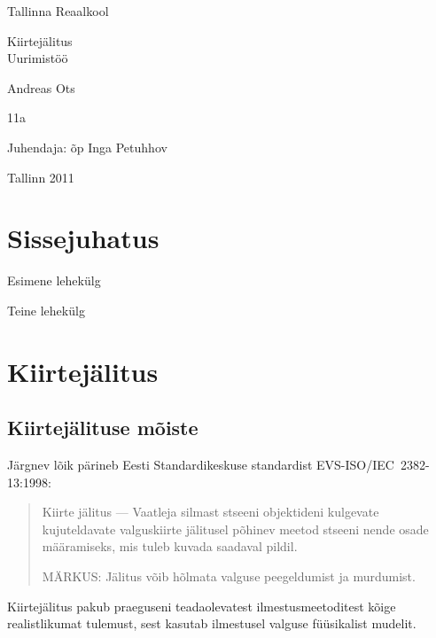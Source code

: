 \documentclass[a4paper,12pt]{report}
\begin{document}
\begin{center}
Tallinna Reaalkool

\vfill

Kiirtejälitus\\
Uurimistöö

\vfill

\end{center}

\begin{raggedleft}

Andreas Ots

11a

Juhendaja: õp Inga Petuhhov

\end{raggedleft}

\vfill

\begin{center}

Tallinn 2011

\end{center}
\clearpage

\tableofcontents
\listoffigures
\listoftables
\lstlistoflistings

\chapter*{Sissejuhatus}
\pagestyle{plain}
\thispagestyle{empty}
Esimene lehekülg

\clearpage

Teine lehekülg

\chapter{Kiirtejälitus}
\section{Kiirtejälituse mõiste}
Järgnev lõik pärineb Eesti Standardikeskuse standardist EVS-ISO/IEC~2382-13:1998:
\begin{quote}
Kiirte jälitus --- Vaatleja silmast stseeni objektideni kulgevate
kujuteldavate valguskiirte jälitusel põhinev meetod stseeni nende osade
määramiseks, mis tuleb kuvada saadaval pildil.

MÄRKUS: Jälitus võib hõlmata valguse peegeldumist ja murdumist.\cite{ISO:2382-13}
\end{quote}

Kiirtejälitus pakub praeguseni teadaolevatest ilmestusmeetoditest kõige
realistlikumat tulemust, sest kasutab ilmestusel valguse füüsikalist
mudelit.
\end{document}
